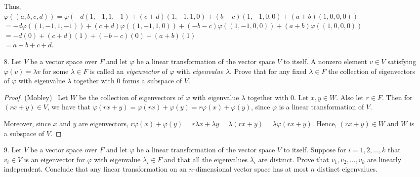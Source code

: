 \documentclass[10pt]{article}
\renewcommand{\phi}{\varphi}
\begin{document}
\begin{itemize}
Thus,
\\ $\varphi((a,b,c,d)) = \varphi( -d(1,-1,1,-1) + (c+d)(1,-1,1,0) + (b-c)(1,-1,0,0) + (a+b)(1,0,0,0) )$\\
 $= -d\varphi((1,-1,1,-1)) + (c+d)\varphi((1,-1,1,0)) + (-b-c)\varphi((1,-1,0,0)) + (a+b)\varphi((1,0,0,0))$\\
 $= -d(0) + (c+d)(1) + (-b-c)(0) + (a+b)(1)$\\
 $= a + b + c + d$.

\item[8.]
Let $V$ be a vector space over $F$ and let $\varphi$ be a linear transformation of the vector space $V$ to itself.  A nonzero element $v\in V$ satisfying $\varphi (v) = \lambda v$ for some $\lambda \in F$ is called an \textit{eigenvector} of $\varphi$ with \textit{eigenvalue $\lambda$}.  Prove that for any fixed $\lambda \in F$ the collection of eigenvectors of $\varphi$ with eigenvalue $\lambda$ together with $0$ forms a subspace of $V$.

\begin{proof}(Mobley) \ Let $W$ be the collection of eigenvectors of $\varphi$ with eigenvalue $\lambda$ together with $0$.  Let $x,y \in W$.  Also let $r \in F$.  Then for $(rx+y)\in V$, we have that $\varphi(rx+y)=\varphi(rx)+\varphi(y) = r \varphi(x) + \varphi(y)$, since $\varphi$ is a linear transformation of $V$.

Moreover, since $x$ and $y$ are eigenvectors, $r \varphi(x) + \varphi(y) =
r \lambda x + \lambda y = \lambda (rx + y) = \lambda \varphi(rx + y)$.
Hence, $(rx+y) \in W$ and $W$ is a subspace of $V$.
\end{proof}

\item[9.] Let $V$ be a vector space over $F$ and let $\phi$ be a linear transformation of the vector space $V$ to itself.  Suppose for $i = 1,2,\ldots, k$ that $v_i \in V$ is an eigenvector for $\phi$ with eigenvalue $\lambda_i \in F$ and that all the eigenvalues $\lambda_i$ are distinct.  Prove that $v_1,v_2,\ldots,v_k$ are linearly independent.  Conclude that any linear transformation on an $n$-dimensional vector space has at most $n$ distinct eigenvalues.


\end{itemize}
\end{document}
